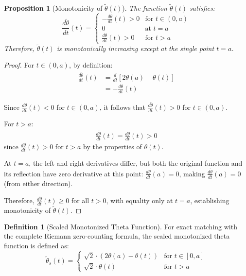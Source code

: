 \documentclass{article}
\newtheorem{proposition}[theorem]{Proposition}
\theoremstyle{definition}
\newtheorem{definition}[theorem]{Definition}
\begin{document}
\begin{proposition}[Monotonicity of $\tilde{\theta}(t)$]
The function $\tilde{\theta}(t)$ satisfies:
\begin{equation}
\frac{d\tilde{\theta}}{dt}(t) = 
\begin{cases}
-\frac{d\theta}{dt}(t) > 0 & \text{for } t \in (0,a) \\
0 & \text{at } t = a \\
\frac{d\theta}{dt}(t) > 0 & \text{for } t > a
\end{cases}
\end{equation}
Therefore, $\tilde{\theta}(t)$ is monotonically increasing except at the single point $t = a$.
\end{proposition}

\begin{proof}
For $t \in (0,a)$, by definition:
\begin{align}
\frac{d\tilde{\theta}}{dt}(t) &= \frac{d}{dt}[2\theta(a) - \theta(t)] \\
&= -\frac{d\theta}{dt}(t)
\end{align}

Since $\frac{d\theta}{dt}(t) < 0$ for $t \in (0,a)$, it follows that $\frac{d\tilde{\theta}}{dt}(t) > 0$ for $t \in (0,a)$.

For $t > a$:
\begin{align}
\frac{d\tilde{\theta}}{dt}(t) = \frac{d\theta}{dt}(t) > 0
\end{align}
since $\frac{d\theta}{dt}(t) > 0$ for $t > a$ by the properties of $\theta(t)$.

At $t = a$, the left and right derivatives differ, but both the original function and its reflection have zero derivative at this point: $\frac{d\theta}{dt}(a) = 0$, making $\frac{d\tilde{\theta}}{dt}(a) = 0$ (from either direction).

Therefore, $\frac{d\tilde{\theta}}{dt}(t) \geq 0$ for all $t > 0$, with equality only at $t = a$, establishing monotonicity of $\tilde{\theta}(t)$.
\end{proof}

\begin{definition}[Scaled Monotonized Theta Function]
For exact matching with the complete Riemann zero-counting formula, the scaled monotonized theta function is defined as:
\begin{equation}
\tilde{\theta}_s(t) = 
\begin{cases}
\sqrt{2} \cdot (2\theta(a) - \theta(t)) & \text{for } t \in [0,a] \\
\sqrt{2} \cdot \theta(t) & \text{for } t > a
\end{cases}
\end{equation}
\end{definition}
\end{document}
